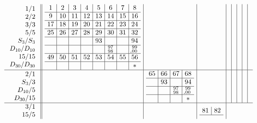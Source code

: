 \documentclass[12pt,a4paper]{amsart}
\begin{document}
\newpage
\begin{align*} \arraycolsep4pt
  \begin{array}{r||c|c|c|c|c|c|c|c}
    \begin{array}{r}
1/1 \\ 2/2 \\ 3/3 \\ 5/5 \\ S_3/S_3 \\ D_{10}/D_{10} \\ 15/15 \\ D_{30}/D_{30} \\
    \end{array}
    &
      \begin{array}{c|c|c|c|c|c|c|c}
 1& 2& 3& 4& 5& 6& 7& 8\\ \hline
 9&10&11&12&13&14&15&16\\ \hline
17&18&19&20&21&22&23&24\\ \hline
25&26&27&28&29&30&31&32\\ \hline
  &  &  &  &93&  &  &94\\ \hline
&&&&&^{97}_{98}&&^{99}_{\llap{.}00}\\ \hline
49&50&51&52&53&54&55&56\\ \hline
  &  &  &  &  &  &  & *\\
      \end{array}
&&&&&&& \\ \hline
    \begin{array}{r}
2/1 \\ S_3/3 \\ D_{10}/5 \\ D_{30}/15 \\
    \end{array}
    &&
       \begin{array}{c|c|c|c}
65&66&67&68 \\ \hline
  &93&  &94 \\ \hline
&&^{97}_{98}&^{99}_{\llap{.}00} \\ \hline
  &  &  & * \\
       \end{array}
&&&&&& \\ \hline
    \begin{array}{r}
3/1 \\ 15/5 \\
    \end{array}
    &&&
        \begin{array}{c|c}
          81&82 \\ \hline

\end{array}
\end{array}
\end{align*}
\end{document}
